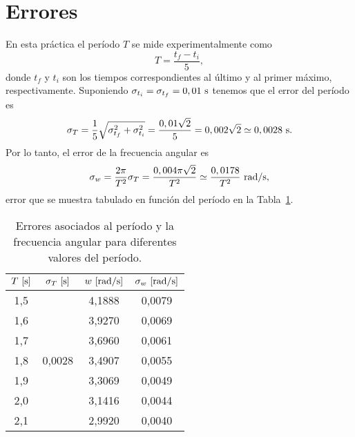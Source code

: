 
\newpage
\section{Errores}

En esta pr\'actica el per\'iodo $T$ se mide experimentalmente como
%
\begin{equation*}
  T = \frac{t_f - t_i}{5},
\end{equation*}
%
donde $t_f$ y $t_i$ son los tiempos correspondientes al \'ultimo y al primer m\'aximo, respectivamente. Suponiendo $\sigma_{t_i} = \sigma_{t_f} = 0,01~{\rm s}$ tenemos que el error del per\'iodo es
%
\begin{equation*}
\sigma_T = \frac{1}{5}\sqrt{\sigma_{t_f}^2 + \sigma_{t_i}^2} = \frac{0,01\sqrt{2}}{5} = 0,002\sqrt{2} \simeq 0,0028~{\rm s}.
\end{equation*}
%
Por lo tanto, el error de la frecuencia angular es
%
\begin{equation*}
\sigma_w = \frac{2\pi}{T^2}\sigma_T = \frac{0,004\pi\sqrt{2}}{T^2} \simeq \frac{0,0178}{T^2}~{\rm rad/s},
\end{equation*}
%
error que se muestra tabulado en funci\'on del per\'iodo en la Tabla~\ref{tabla:errores}.

\begin{table}[h!]
\centering
\begin{tabular}{c | c | c | c}
\hline
$T~{\rm [s]}$ & $\sigma_T~{\rm [s]}$    & $w~{\rm [rad/s]}$ & $\sigma_w~{\rm [rad/s]}$ \\
\hline
1,5           & \multirow{7}{*}{0,0028} & 4,1888            & 0,0079 \\
1,6           &                         & 3,9270            & 0,0069 \\
1,7           &                         & 3,6960            & 0,0061 \\
1,8           &                         & 3,4907            & 0,0055 \\
1,9           &                         & 3,3069            & 0,0049 \\
2,0           &                         & 3,1416            & 0,0044 \\
2,1           &                         & 2,9920            & 0,0040 \\
\hline
\end{tabular}\caption{Errores asociados al per\'iodo y la frecuencia angular para diferentes valores del per\'iodo.}
\label{tabla:errores}
\end{table}
